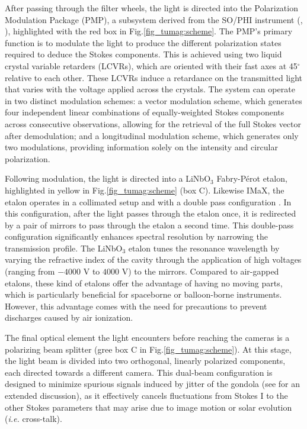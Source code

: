 After passing through the filter wheels, the light is directed into the Polarization Modulation Package (PMP), a subsystem derived from the SO/PHI instrument (\citealt{pmp1}, \citealt{PHI}), highlighted with the red box in Fig.\ref{fig_tumag:scheme}. The PMP's primary function is to modulate the light to produce the different polarization states required to deduce the Stokes components. This is achieved using two liquid crystal variable retarders (LCVRs), which are oriented with their fast axes at 45$^\circ$ relative to each other. These LCVRs induce a retardance on the transmitted light that varies with the voltage applied across the crystals. The system can operate in two distinct modulation schemes: a vector modulation scheme, which generates four independent linear combinations of equally-weighted Stokes components across consecutive observations, allowing for the retrieval of the full Stokes vector after demodulation; and a longitudinal modulation scheme, which generates only two modulations, providing information solely on the intensity and circular polarization.

Following modulation, the light is directed into a LiNbO$_3$ Fabry-Pérot etalon, highlighted in yellow in Fig.\ref{fig_tumag:scheme} (box C). Likewise IMaX, the etalon operates in a collimated setup and with a double pass configuration \citep{etalon-doublepass}. In this configuration, after the light passes through the etalon once, it is redirected by a pair of mirrors to pass through the etalon a second time. This double-pass configuration significantly enhances spectral resolution by narrowing the transmission profile. The LiNbO$_3$ etalon tunes the resonance wavelength by varying the refractive index of the cavity through the application of high voltages (ranging from $-4000$ V to $4000$ V) to the mirrors. Compared to air-gapped etalons, these kind of etalons offer the advantage of having no moving parts, which is particularly beneficial for spaceborne or balloon-borne instruments. However, this advantage comes with the need for precautions to prevent discharges caused by air ionization.

The final optical element the light encounters before reaching the cameras is a polarizing beam splitter (gree box C in Fig.\ref{fig_tumag:scheme}). At this stage, the light beam is divided into two orthogonal, linearly polarized components, each directed towards a different camera. This dual-beam configuration \citep{lites-doublebeam} is designed to minimize spurious signals induced by jitter of the gondola (see \cite{libro_JoseCarlos} for an extended discussion), as it effectively cancels fluctuations from Stokes I to the other Stokes parameters that may arise due to image motion or solar evolution (\textit{i.e.} cross-talk).

